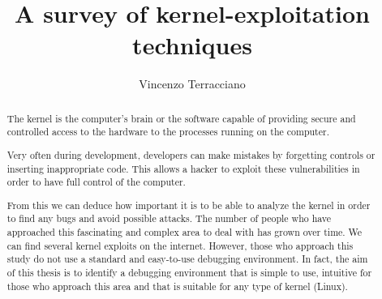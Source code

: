 \documentclass{masterthesis}
\begin{document}
\title{A survey of kernel-exploitation techniques}

\author{Vincenzo Terracciano}



\maketitle

\begin{abstract}
The kernel is the computer’s brain or the software capable of providing secure and controlled access to the hardware to the processes running on the computer.

Very often during development, developers can make mistakes by forgetting controls or inserting inappropriate code. This allows a hacker to exploit these vulnerabilities in order to have full control of the computer.

From this we can deduce how important it is to be able to analyze the kernel in order to find any bugs and avoid possible attacks. The number of people who have approached this fascinating and complex area to deal with has grown over time. We can find several kernel exploits on the internet. However, those who approach this study do not use a standard and easy-to-use debugging environment.
In fact, the aim of this thesis is to identify a debugging environment that is simple to use, intuitive for those who approach this area and that is suitable for any type of kernel (Linux).



\end{abstract}




\tableofcontents
\end{document}
